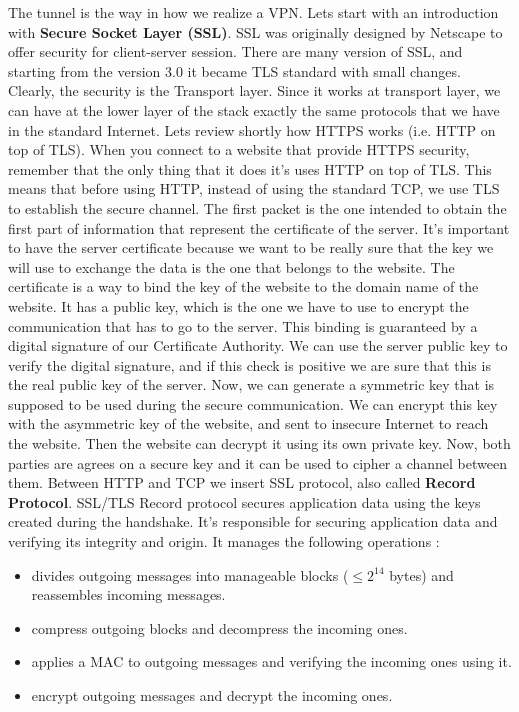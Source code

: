 \documentclass[11pt]{article}
\begin{document}
The tunnel is the way in how we realize a VPN. Lets start with an introduction with \textbf{Secure Socket Layer (SSL)}. SSL was originally designed by Netscape to offer security for client-server session. There are many version of SSL, and starting from the version 3.0 it became TLS standard with small changes. Clearly, the security is the Transport layer. Since it works at transport layer, we can have at the lower layer of the stack exactly the same protocols that we have in the standard Internet. Lets review shortly how HTTPS works (i.e. HTTP on top of TLS). When you connect to a website that provide HTTPS security, remember that the only thing that it does it's uses HTTP on top of TLS. This means that before using HTTP, instead of using the standard TCP, we use TLS to establish the secure channel. The first packet is the one intended to obtain the first part of information that represent the certificate of the server. It's important to have the server certificate because we want to be really sure that the key we will use to exchange the data is the one that belongs to the website. The certificate is a way to bind the key of the website to the domain name of the website. It has a public key, which is the one we have to use to encrypt the communication that has to go to the server. This binding is guaranteed by a digital signature of our Certificate Authority. We can use the server public key to verify the digital signature, and if this check is positive we are sure that this is the real public key of the server. Now, we can generate a symmetric key that is supposed to be used during the secure communication. We can encrypt this key with the asymmetric key of the website, and sent to insecure Internet to reach the website. Then the website can decrypt it using its own private key. Now, both parties are agrees on a secure key and it can be used to cipher a channel between them. Between HTTP and TCP we insert SSL protocol, also called \textbf{Record Protocol}. SSL/TLS Record protocol secures application data using the keys created during the handshake. It's  responsible for securing application data and verifying its integrity and origin. It manages the following operations :
\begin{itemize}
\item divides outgoing messages into manageable blocks ($\leq 2^{14}$ bytes) and reassembles incoming messages.
\item compress outgoing blocks and decompress the incoming ones.
\item applies a MAC to outgoing messages and verifying the incoming ones using it.
\item encrypt outgoing messages and decrypt the incoming ones.
\end{itemize}
\end{document}
